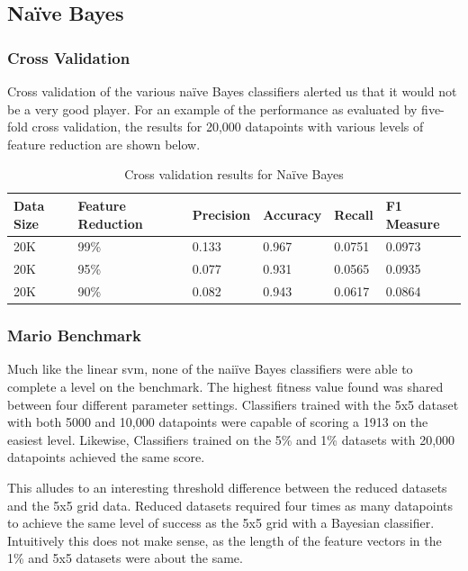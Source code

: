 \documentclass[]{article}   %
\begin{document}
\subsection{Na\"{i}ve Bayes}
\subsubsection{Cross Validation}
Cross validation of the various na\"{i}ve Bayes classifiers alerted us that it would not be a very good player. For an example of the
performance as evaluated by five-fold cross validation, the results for 20,000 datapoints with various levels of feature reduction are
shown below.

\begin{table}[h!]
	\begin{center}
		\caption{Cross validation results for Na\"{i}ve Bayes}
		\begin{tabular}{l | l || l | l | l | l }
		\hline
		Data Size & Feature Reduction & Precision & Accuracy & Recall & F1 Measure \\
		\hline
		20K & 99\% & 0.133 & 0.967 & 0.0751 & 0.0973 \\
		20K & 95\% & 0.077 & 0.931 & 0.0565 & 0.0935 \\
		20K & 90\% & 0.082 & 0.943 & 0.0617 & 0.0864 \\
		\hline
		\end{tabular}
	\end{center}
\end{table}

\subsubsection{Mario Benchmark}
Much like the linear svm, none of the nai\"{i}ve Bayes classifiers were able to complete a level on the benchmark. The highest fitness
value found was shared between four different parameter settings. Classifiers trained with the 5x5 dataset with both 5000 and 10,000
datapoints were capable of scoring a 1913 on the easiest level. Likewise, Classifiers trained on the 5\% and 1\% datasets with 20,000
datapoints achieved the same score.

This alludes to an interesting threshold difference between the reduced datasets and the 5x5 grid data. Reduced datasets required four
times as many datapoints to achieve the same level of success as the 5x5 grid with a Bayesian classifier. Intuitively this does not make sense,
as the length of the feature vectors in the 1\% and 5x5 datasets were about the same. 
\end{document}
